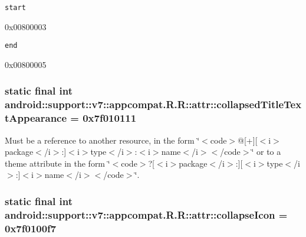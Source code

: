{\tt start}

0x00800003

{\tt end}

0x00800005\hypertarget{classandroid_1_1support_1_1v7_1_1appcompat_1_1_r_1_1attr_d68b6792fd0089d2d7d483d99f5d1047}{
\subsubsection[{collapsedTitleTextAppearance}]{\setlength{\rightskip}{0pt plus 5cm}static final int android::support::v7::appcompat.R.R::attr::collapsedTitleTextAppearance = 0x7f010111}}
\label{classandroid_1_1support_1_1v7_1_1appcompat_1_1_r_1_1attr_d68b6792fd0089d2d7d483d99f5d1047}


Must be a reference to another resource, in the form \char`\"{}$<$code$>$@\mbox{[}+\mbox{]}\mbox{[}$<$i$>$package$<$/i$>$:\mbox{]}$<$i$>$type$<$/i$>$:$<$i$>$name$<$/i$>$$<$/code$>$\char`\"{} or to a theme attribute in the form \char`\"{}$<$code$>$?\mbox{[}$<$i$>$package$<$/i$>$:\mbox{]}\mbox{[}$<$i$>$type$<$/i$>$:\mbox{]}$<$i$>$name$<$/i$>$$<$/code$>$\char`\"{}. \hypertarget{classandroid_1_1support_1_1v7_1_1appcompat_1_1_r_1_1attr_fbe798ed096eb3218764496c6283e13d}{
\subsubsection[{collapseIcon}]{\setlength{\rightskip}{0pt plus 5cm}static final int android::support::v7::appcompat.R.R::attr::collapseIcon = 0x7f0100f7}}
\label{classandroid_1_1support_1_1v7_1_1appcompat_1_1_r_1_1attr_fbe798ed096eb3218764496c6283e13d}


